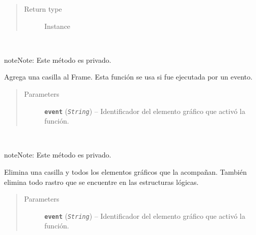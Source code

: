 \documentclass[letterpaper,10pt,english]{sphinxmanual}
\begin{document}
\begin{fulllineitems}
\begin{quote}
\begin{description}
\item[{Return type}] \leavevmode
Instance

\end{description}\end{quote}

\begin{fulllineitems}
\label{View/Main/DecisionVariable/VariableFrame:View.Main.DecisionVariable.VariableFrame.VariableFrame._VariableFrame__add_variable}~
\begin{notice}{note}{Note:}
Este método es privado.
\end{notice}

Agrega una casilla al Frame. Esta función se usa si 
fue ejecutada por un evento.
\begin{quote}\begin{description}
\item[{Parameters}] \leavevmode
\textbf{\texttt{event}} (\emph{\texttt{String}}) -- Identificador del elemento gráfico que activó la función.

\end{description}\end{quote}

\end{fulllineitems}


\begin{fulllineitems}
\label{View/Main/DecisionVariable/VariableFrame:View.Main.DecisionVariable.VariableFrame.VariableFrame._VariableFrame__delete_single_variable}~
\begin{notice}{note}{Note:}
Este método es privado.
\end{notice}

Elimina una casilla y todos los elementos gráficos que la acompañan.
También elimina todo rastro que se encuentre en las estructuras lógicas.
\begin{quote}\begin{description}
\item[{Parameters}] \leavevmode
\textbf{\texttt{event}} (\emph{\texttt{String}}) -- Identificador del elemento gráfico que activó la función.

\end{description}\end{quote}


\end{fulllineitems}
\end{fulllineitems}
\end{document}
